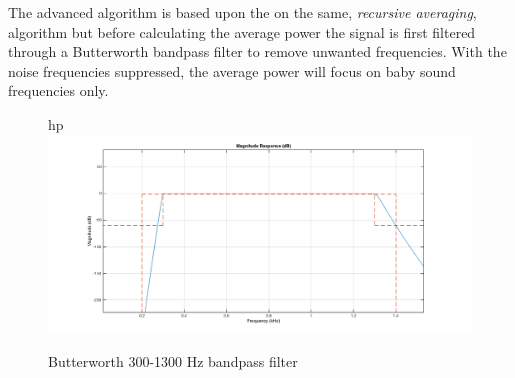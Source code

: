 The advanced algorithm is based upon the on the same, \emph{recursive averaging}, algorithm but before calculating
the average power the signal is first filtered through a Butterworth bandpass filter to remove unwanted 
frequencies. With the noise frequencies suppressed, the average power will focus on baby sound frequencies only. 

\begin{figure}{hp}
  \centering
  \includegraphics[width=1\textwidth]{sections/butt_pass_scale.png}
  \caption{Butterworth 300-1300 Hz bandpass filter}
  \label{fig:butt_pass}
\end{figure}

